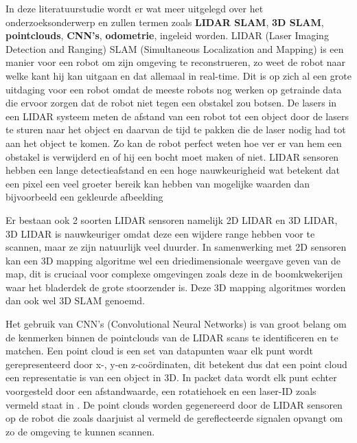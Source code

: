 In deze literatuurstudie wordt er wat meer uitgelegd over het onderzoeksonderwerp en zullen termen zoals \textbf{LIDAR SLAM}, \textbf{3D SLAM}, \textbf{pointclouds}, \textbf{CNN's}, \textbf{odometrie}, ingeleid worden.
LIDAR (Laser Imaging Detection and Ranging) SLAM (Simultaneous Localization and Mapping) is een manier voor een robot om zijn omgeving te reconstrueren, zo weet de robot naar welke kant hij kan uitgaan en dat allemaal in real-time. \autocite{8215333}
Dit is op zich al een grote uitdaging voor een robot omdat de meeste robots nog werken op getrainde data die ervoor zorgen dat de robot niet tegen een obstakel zou botsen.
De lasers in een LIDAR systeem meten de afstand van een robot tot een object door de lasers te sturen naar het object en daarvan de tijd te pakken die de laser nodig had tot aan het object te komen. \autocite{9526266}
Zo kan de robot perfect weten hoe ver er van hem een obstakel is verwijderd en of hij een bocht moet maken of niet.
LIDAR sensoren hebben een lange detectieafstand en een hoge nauwkeurigheid wat betekent dat een pixel een veel groeter bereik kan hebben van mogelijke waarden dan bijvoorbeeld een gekleurde afbeelding\autocite{3D_LIDAR}\newline

Er bestaan ook 2 soorten LIDAR sensoren namelijk 2D LIDAR en 3D LIDAR, 3D LIDAR is nauwkeuriger omdat deze een wijdere range hebben voor te scannen, maar ze zijn natuurlijk veel duurder.
In samenwerking met 2D sensoren kan een 3D mapping algoritme wel een driedimensionale weergave geven van de map, dit is cruciaal voor complexe omgevingen zoals deze in de boomkwekerijen waar het bladerdek de grote stoorzender is.
Deze 3D mapping algoritmes worden dan ook wel 3D SLAM genoemd.\newline

Het gebruik van CNN's (Convolutional Neural Networks) is van groot belang om de kenmerken binnen de pointclouds van de LIDAR scans te identificeren en te matchen.
Een point cloud is een set van datapunten waar elk punt wordt gerepresenteerd door x-, y-en z-coördinaten, dit betekent dus dat een point cloud een representatie is van een object in 3D. \autocite{HAN2017103}
In packet data wordt elk punt echter voorgesteld door een afstandwaarde, een rotatiehoek en een laser-ID zoals vermeld staat in \autocite{3D_LIDAR}.
De point clouds worden gegenereerd door de LIDAR sensoren op de robot die zoals daarjuist al vermeld de gereflecteerde signalen opvangt om zo de omgeving te kunnen scannen.

